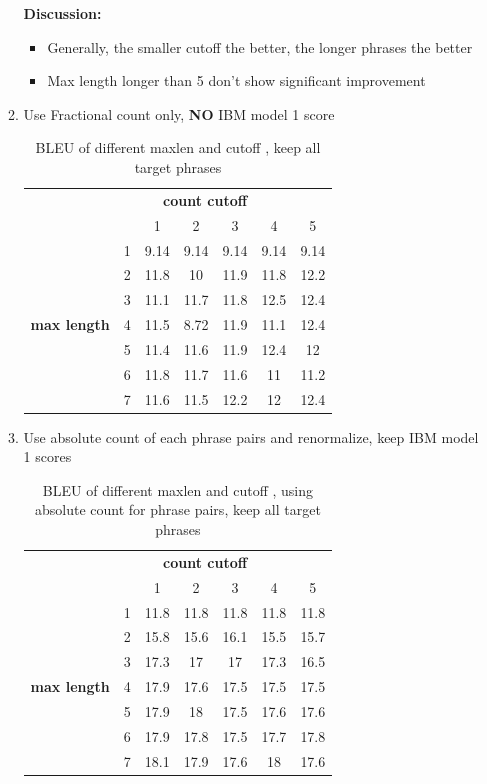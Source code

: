 \documentclass[11pt, letterpaper]{article}   	%
\begin{document}
\begin{enumerate}
\begin{enumerate}
\textbf{Discussion:}
\begin{itemize}
\item Generally, the smaller cutoff the better, the longer phrases the better
\item Max length longer than 5 don't show significant improvement
\end{itemize}

\item Use Fractional count only, \textbf{NO} IBM model 1 score
\begin{table}[H]
\centering
\begin{tabular}{ c c | c | c | c | c|c }
& \multicolumn{5}{c}{\bf{ count cutoff}}  \\
&  & 1 &	2 &	3 &	4 &	5\\
\hline
\multirow{7}{*}{\bf{max length}}
& 1 &	9.14 &	9.14 &	9.14 &	9.14 &	9.14\\
\cline{2-7}
& 2 &	11.8 &	10 &	11.9 &	11.8 &	12.2\\
\cline{2-7}
& 3 &	11.1 &	11.7 &	11.8 &	12.5 &	12.4\\
\cline{2-7}
& 4 &	11.5 &	8.72 &	11.9 &	11.1 &	12.4\\
\cline{2-7}
& 5 &	11.4 &	11.6 &	11.9 &	12.4 &	12\\
\cline{2-7}
& 6 &	11.8 &	11.7 &	11.6 &	11 &	11.2\\
\cline{2-7}
& 7 &	11.6 &	11.5 &	12.2 &	12 &	12.4\\
\hline
\end{tabular}
\label{tab:fraconly}
\caption{BLEU of different maxlen and cutoff , keep all target phrases}
\end{table}

\item Use absolute count of each phrase pairs and renormalize, keep IBM model 1 scores
\begin{table}[H]
\centering
\begin{tabular}{ c c | c | c | c | c|c }
& \multicolumn{5}{c}{\bf{ count cutoff}}  \\
&  & 1 &	2 &	3 &	4 &	5\\
\hline
\multirow{7}{*}{\bf{max length}}
& 1 &	11.8 &	11.8 &	11.8 &	11.8 &	11.8\\
\cline{2-7}
& 2 &	15.8 &	15.6 &	16.1 &	15.5 &	15.7\\
\cline{2-7}
& 3 &	17.3 &	17 &	17 &	17.3 &	16.5\\
\cline{2-7}
& 4 &	17.9 &	17.6 &	17.5 &	17.5 &	17.5\\
\cline{2-7}
& 5 &	17.9 &	18 &	17.5 &	17.6 &	17.6\\
\cline{2-7}
& 6 &	17.9 &	17.8 &	17.5 &	17.7 &	17.8\\
\cline{2-7}
& 7 &	18.1 &	17.9 &	17.6 &	18 &	17.6\\
\hline
\end{tabular}
\label{tab:countlex}
\caption{BLEU of different maxlen and cutoff , using absolute count for phrase pairs, keep all target phrases}
\end{table}


\end{enumerate}
\end{enumerate}
\end{document}
